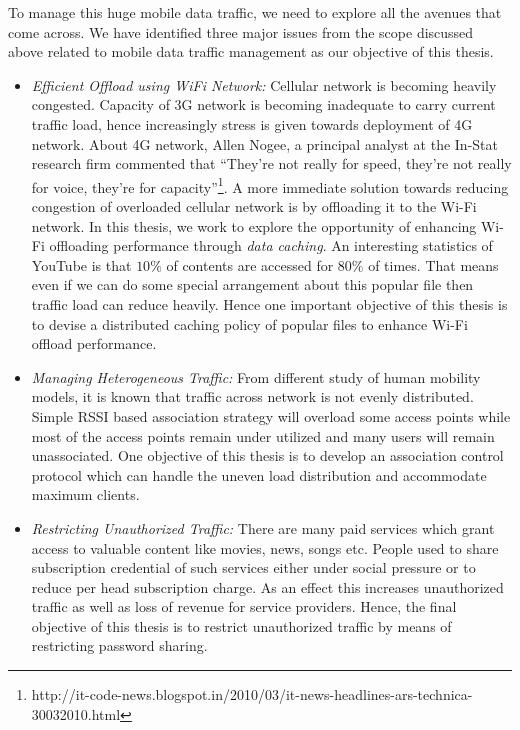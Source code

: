 To manage this huge mobile data traffic, we need to explore all the avenues that come across. We have identified three major issues from the scope discussed above related to mobile data traffic management as our objective of this thesis.
\begin{itemize}
 \item [] {\em Efficient Offload using WiFi Network:} Cellular network is becoming heavily congested. Capacity of 3G network is becoming inadequate to carry current traffic load, hence increasingly stress is given towards deployment of 4G network. About 4G network, Allen Nogee, a principal analyst at the In-Stat research firm commented that ``They're not really for speed, they're not really for voice, they're for capacity''\footnote{http://it-code-news.blogspot.in/2010/03/it-news-headlines-ars-technica-30032010.html}. A more immediate solution towards reducing congestion of overloaded cellular network is by offloading it to the Wi-Fi network. In this thesis, we work to explore the opportunity of enhancing Wi-Fi offloading performance through {\em data caching}. An interesting statistics of YouTube is that $10\%$ of contents are accessed for $80\%$ of times. That means even if we can do some special arrangement about this popular file then traffic load can reduce heavily. Hence one important objective of this thesis is to devise a distributed caching policy of popular files to enhance Wi-Fi offload performance.\\ 
 \item [] {\em Managing Heterogeneous Traffic:} From different study of human mobility models, it is known that traffic across network is not evenly distributed. Simple RSSI based association strategy will overload some access points while most of the access points remain under utilized and many users will remain unassociated. One objective of this thesis is to develop an association control protocol which can handle the uneven load distribution and accommodate maximum clients.\\
 \item [] {\em Restricting Unauthorized Traffic:} There are many paid services which grant access to valuable content like movies, news, songs etc. People used to share subscription credential of such services either under social pressure or to reduce per head subscription charge. As an effect this increases unauthorized traffic as well as loss of revenue for service providers. Hence, the final objective of this thesis is to restrict unauthorized traffic by means of restricting password sharing.
\end{itemize}


